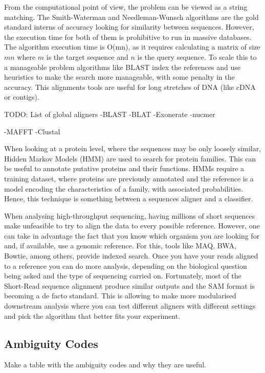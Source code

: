 From the computational point of view, the problem can be viewed as a string matching. The Smith-Waterman\cite{Smith1981} and Needleman-Wunsch\cite{Needleman1970} algorithms are the gold standard interns of accuracy looking for similarity between sequences. However, the execution time for both of them is prohibitive to run in massive databases. The algorithm execution time is O(mn), as it requires calculating a matrix of size $mn$ where $m$ is the target sequence and $n$ is the query sequence.  To scale this to a manageable problem algorithms like BLAST index the references and use heuristics to make the search more manageable, with some penalty in the accuracy. This alignments tools are useful for long stretches of DNA (like cDNA or contigs)\cite{Altschul1990}.

TODO: List of global aligners
-BLAST
-BLAT
-Exonerate
-nucmer

-MAFFT
-Clustal


When looking at a protein level, where the sequences may be only loosely similar, Hidden Markov Models (HMM) are used to search for protein families. This can be useful to annotate putative proteins and their functions. HMMs require a training dataset, where proteins are previously annotated and the reference is a model encoding the characteristics of a family, with associated probabilities. Hence, this technique is something between a sequences aligner and a classifier\cite{Eddy2004}. 

When analysing high-throughput sequencing, having millions of short sequences make unfeasible to try to align the data to every possible reference. However, one can take in advantage the fact that you know which organism you are looking for and, if available, use a genomic reference. For this, tools like MAQ, BWA, Bowtie, among others, provide indexed search.  Once you have your reads aligned to a reference you can do more analysis, depending on the biological question being asked and the type of sequencing carried on.  Fortunately, most of the Short-Read sequence alignment produce similar outputs and the SAM format is becoming a de facto standard. This is allowing to make more modularised downstream analysis where you can test different aligners with different settings and pick the algorithm that better fits your experiment\cite{Liu2012,Li2009,Li2009a}. 

\subsection{Ambiguity Codes}
\label{lit:ambiguity}
Make a table with the ambiguity codes and why they are useful. 




